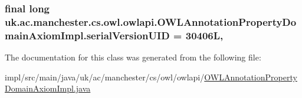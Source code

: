 \hypertarget{classuk_1_1ac_1_1manchester_1_1cs_1_1owl_1_1owlapi_1_1_o_w_l_annotation_property_domain_axiom_impl_a19eefd0648a105cc33b7fd96edbcb3ca}{
\subsubsection[{serial\-Version\-U\-I\-D}]{\setlength{\rightskip}{0pt plus 5cm}final long uk.\-ac.\-manchester.\-cs.\-owl.\-owlapi.\-O\-W\-L\-Annotation\-Property\-Domain\-Axiom\-Impl.\-serial\-Version\-U\-I\-D = 30406\-L\hspace{0.3cm}{\ttfamily [static]}, {\ttfamily [private]}}}\label{classuk_1_1ac_1_1manchester_1_1cs_1_1owl_1_1owlapi_1_1_o_w_l_annotation_property_domain_axiom_impl_a19eefd0648a105cc33b7fd96edbcb3ca}


The documentation for this class was generated from the following file\-:\begin{DoxyCompactItemize}
\item 
impl/src/main/java/uk/ac/manchester/cs/owl/owlapi/\hyperlink{_o_w_l_annotation_property_domain_axiom_impl_8java}{O\-W\-L\-Annotation\-Property\-Domain\-Axiom\-Impl.\-java}\end{DoxyCompactItemize}
